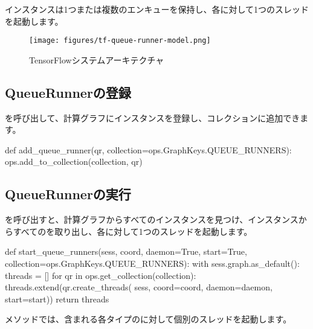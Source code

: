 \begin{content}

インスタンスは1つまたは複数のエンキューを保持し、各に対して1つのスレッドを起動します。

\begin{figure}[!htbp]
\centering
\texttt{[image: figures/tf-queue-runner-model.png]}
\caption{TensorFlowシステムアーキテクチャ}
 \label{fig:tf-queue-runner-model}
\end{figure}

\subsection{QueueRunnerの登録}

を呼び出して、計算グラフにインスタンスを登録し、コレクションに追加できます。

\begin{leftbar}
\begin{python}
def add_queue_runner(qr, collection=ops.GraphKeys.QUEUE_RUNNERS):
  ops.add_to_collection(collection, qr)
\end{python}
\end{leftbar}

\subsection{QueueRunnerの実行}

を呼び出すと、計算グラフからすべてのインスタンスを見つけ、インスタンスからすべてのを取り出し、各に対して1つのスレッドを起動します。

\begin{leftbar}
\begin{python}
def start_queue_runners(sess, coord, daemon=True, start=True,
                        collection=ops.GraphKeys.QUEUE_RUNNERS):
  with sess.graph.as_default():
    threads = []
    for qr in ops.get_collection(collection):
      threads.extend(qr.create_threads(
          sess, coord=coord, daemon=daemon, start=start))
  return threads
\end{python}
\end{leftbar}

メソッドでは、含まれる各タイプのに対して個別のスレッドを起動します。


\end{content}
